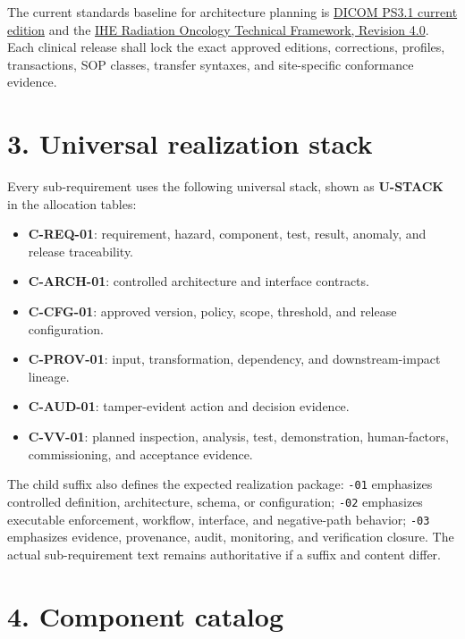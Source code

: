 \documentclass[11pt,letterpaper]{article}
\begin{document}
The current standards baseline for architecture planning is \href{https://dicom.nema.org/medical/dicom/current/output/chtml/part01/sect_1.2.html}{DICOM PS3.1 current edition} and the \href{https://profiles.ihe.net/RO/index.html}{IHE Radiation Oncology Technical Framework, Revision 4.0}. Each clinical release shall lock the exact approved editions, corrections, profiles, transactions, SOP classes, transfer syntaxes, and site-specific conformance evidence.

\section{3. Universal realization stack}

Every sub-requirement uses the following universal stack, shown as \textbf{U-STACK} in the allocation tables:
\begin{itemize}
\item \textbf{C-REQ-01}: requirement, hazard, component, test, result, anomaly, and release traceability.
\item \textbf{C-ARCH-01}: controlled architecture and interface contracts.
\item \textbf{C-CFG-01}: approved version, policy, scope, threshold, and release configuration.
\item \textbf{C-PROV-01}: input, transformation, dependency, and downstream-impact lineage.
\item \textbf{C-AUD-01}: tamper-evident action and decision evidence.
\item \textbf{C-VV-01}: planned inspection, analysis, test, demonstration, human-factors, commissioning, and acceptance evidence.
\end{itemize}

The child suffix also defines the expected realization package: \texttt{-01} emphasizes controlled definition, architecture, schema, or configuration; \texttt{-02} emphasizes executable enforcement, workflow, interface, and negative-path behavior; \texttt{-03} emphasizes evidence, provenance, audit, monitoring, and verification closure. The actual sub-requirement text remains authoritative if a suffix and content differ.

\section{4. Component catalog}
\end{document}
